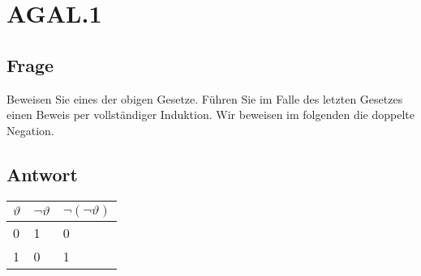 \documentclass[12pt, a4paper]{article}
\begin{document}
\section*{AGAL.1}
\subsection*{Frage}
Beweisen Sie eines der obigen Gesetze. Führen Sie im Falle des letzten Gesetzes einen Beweis per vollständiger Induktion. Wir beweisen im folgenden die doppelte Negation.
\subsection*{Antwort}
\begin{tabular}{|l|l|l|}
\hline
$\vartheta$ & $\neg \vartheta$ & $\neg(\neg \vartheta)$\\ \hline
0 & 1 & 0\\
1 & 0 & 1\\
\hline
\end{tabular}
\end{document}
